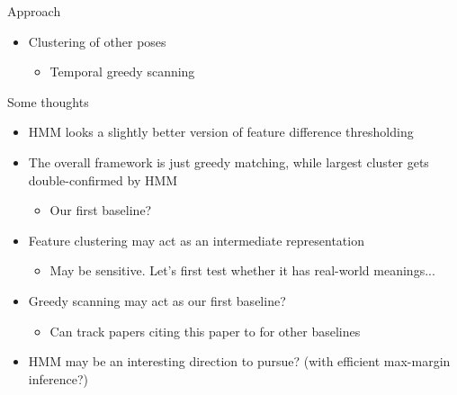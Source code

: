 \documentclass[12pt]{beamer}
\begin{document}
\begin{frame}{Approach}
	\begin{itemize}
		\item Clustering of other poses
		\begin{itemize}
			\item Temporal greedy scanning
			\\  
		\end{itemize}
	\end{itemize}
\end{frame}

\begin{frame}{Some thoughts}
	\begin{itemize}
		\item HMM looks a slightly better version of feature difference thresholding
		\item The overall framework is just greedy matching, while largest cluster gets double-confirmed by HMM
        \begin{itemize}
        	\item Our first baseline?
        \end{itemize}
		\item Feature clustering may act as an intermediate representation
		\begin{itemize}
			\item May be sensitive. Let's first test whether it has real-world meanings...
		\end{itemize}
		\item Greedy scanning may act as our first baseline?
		\begin{itemize}
			\item Can track papers citing this paper to for other baselines
		\end{itemize}
        \item HMM may be an interesting direction to pursue? (with efficient max-margin inference?)
	\end{itemize}
\end{frame}
\end{document}
